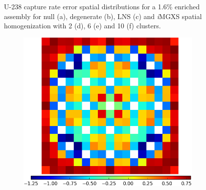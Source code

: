 \begin{figure}[h!]
\begin{subfigure}{0.45\textwidth}
  \caption{}
  \label{fig:chap11-assm-1.6-capt-pinch-10}
\end{subfigure}
\vspace{2mm}
\caption[U-238 capture rate errors for a 1.6\% enriched assembly]{U-238 capture rate error spatial distributions for a 1.6\% enriched assembly for null (a), degenerate (b), \ac{LNS} (c) and \textit{i}\ac{MGXS} spatial homogenization with 2 (d), 6 (e) and 10 (f) clusters.}
\label{fig:chap11-assm-1.6-capt-rates}
\end{figure}

\clearpage

\begin{figure}[h!]
\centering
\begin{subfigure}{0.45\textwidth}
  \centering
  \includegraphics[width=\linewidth]{figures/results/assm-31/pca-transform/capt-err-null}
  \caption{}
  \label{fig:chap11-assm-3.1-capt-null}
\end{subfigure}%
\begin{subfigure}{0.45\textwidth}
  \centering

\end{subfigure}
\end{figure}
